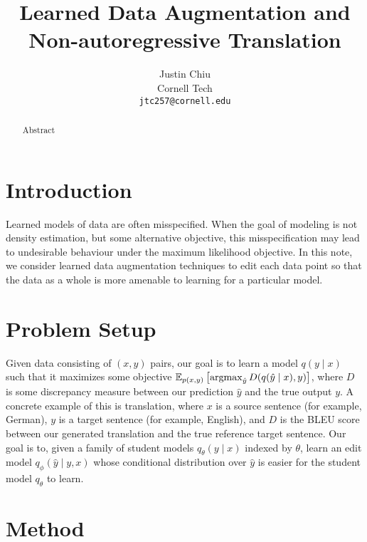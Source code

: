\documentclass[11pt]{article}
\title{Learned Data Augmentation and Non-autoregressive Translation}
\author{Justin Chiu \\
  Cornell Tech \\
  \texttt{jtc257@cornell.edu}}
\begin{document}
\maketitle
\begin{abstract}
Abstract
\end{abstract}

\section{Introduction}
Learned models of data are often misspecified.
When the goal of modeling is not density estimation,
but some alternative objective, this misspecification may lead to undesirable
behaviour under the maximum likelihood objective.
In this note, we consider learned data augmentation techniques to edit
each data point so that the data as a whole is more amenable to learning for a particular model.

\section{Problem Setup}
Given data consisting of $(x,y)$ pairs, our goal is to learn a model $q(y \mid x)$
such that it maximizes some objective $\mathbb{E}_{p(x,y)}\left[\operatorname*{argmax}_{\hat{y}}D(q(\hat{y} \mid x), y)\right]$,
where $D$ is some discrepancy measure between our prediction $\hat{y}$ and the true output $y$.
A concrete example of this is translation, where $x$ is a source sentence (for example, German),
$y$ is a target sentence (for example, English),
and $D$ is the BLEU score between our generated translation and the true
reference target sentence.
Our goal is to, given a family of student models $q_\theta(y \mid x)$ indexed by $\theta$,
learn an edit model $q_\phi(\hat{y} \mid y, x)$ whose conditional distribution over $\hat{y}$
is easier for the student model $q_\theta$ to learn.

\section{Method}



\end{document}
